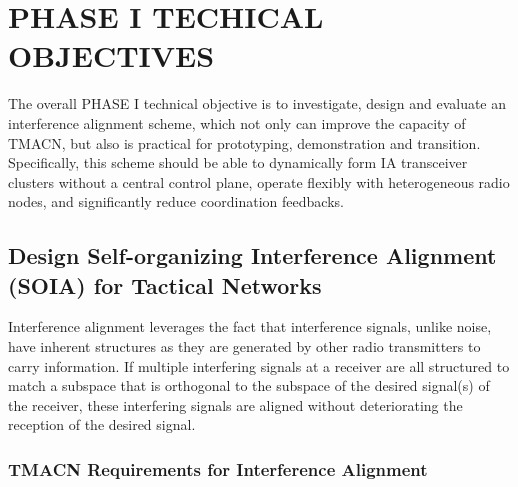 \documentclass[letterpaper,11pt]{article}
\begin{document}
\section{PHASE I TECHICAL OBJECTIVES}


The overall PHASE I technical objective is to investigate, design and evaluate an interference alignment scheme, which not only can improve the capacity of TMACN, but also is practical for prototyping, demonstration and transition. Specifically, this scheme should be able to dynamically form IA transceiver clusters without a central control plane,  operate flexibly with heterogeneous radio nodes, and significantly reduce coordination feedbacks. 



\subsection{Design Self-organizing Interference Alignment (SOIA) for Tactical Networks}

Interference alignment leverages the fact that interference signals, unlike noise, have inherent structures as they are generated by other radio transmitters to carry information. If multiple interfering signals at a receiver are all structured to match a subspace that is orthogonal to the subspace of the desired signal(s) of the receiver, these interfering signals are aligned without deteriorating the reception of the desired signal. 

\subsubsection{TMACN Requirements for Interference Alignment}
\end{document}
